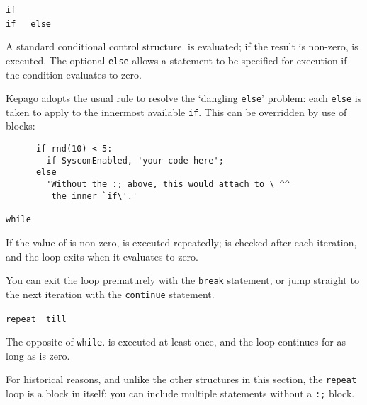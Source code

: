     \noindent\lstinline|if|~~\\
    \lstinline|if|~~~\lstinline|else|~
    \begin{cmdesc}
      A standard conditional control structure.   is evaluated;
      if the result is non-zero,  is executed.  The
      optional \lstinline|else| allows a statement to be specified for execution
      if the condition evaluates to zero.

      Kepago adopts the usual rule to resolve the `dangling
      \lstinline|else|' problem: each \lstinline|else| is taken to apply to the
      innermost available \lstinline|if|.  This can be overridden by use of blocks:

      \begin{lstlisting}
      if rnd(10) < 5:
        if SyscomEnabled, 'your code here';
      else
        'Without the :; above, this would attach to \ ^^
         the inner `if\'.'
      \end{lstlisting}
    \end{cmdesc}

    \noindent\lstinline|while|~~
    \begin{cmdesc}
      If the value of  is non-zero, 
      is executed repeatedly; \metavar{CONDITION} is checked after each
      iteration, and the loop exits when it evaluates to zero.

      You can exit the loop prematurely with the \lstinline|break|
      statement, or jump straight to the next iteration with the
      \lstinline|continue| statement.
    \end{cmdesc}

    \noindent\lstinline|repeat|~~\lstinline|till|~
    \begin{cmdesc}
      The opposite of \lstinline|while|.   is executed
      at least once, and the loop continues for as long as 
      is zero.

      For historical reasons, and unlike the other structures in this section,
      the \lstinline|repeat| loop is a block in itself: you can include multiple
      statements without a \lstinline|:;| block.
    \end{cmdesc}

